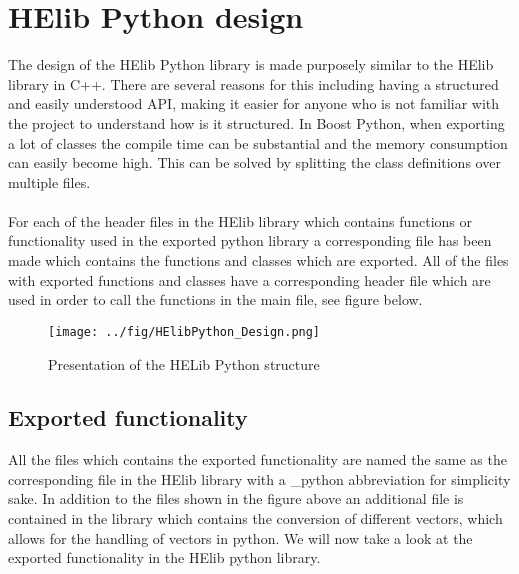 \newpage

\section{HElib Python design}
The design of the HElib Python library is made purposely similar to the HElib library in C++. There are several reasons for this including having a structured and easily understood API, making it easier for anyone who is not familiar with the project to understand how is it structured. In Boost Python, when exporting a lot of classes the compile time can be substantial and the memory consumption can easily become high. This can be solved by splitting the class definitions over multiple files\cite{boost2017}.\\\\
For each of the header files in the HElib library which contains functions or functionality used in the exported python library a corresponding file has been made which contains the functions and classes which are exported. All of the files with exported functions and classes have a corresponding header file which are used in order to call the functions in the main file, see figure below.

\begin{figure}[h]
\caption{Presentation of the HELib Python structure}
\centering
\texttt{[image: ../fig/HElibPython\_Design.png]}
\end{figure}


\subsection{Exported functionality}
All the files which contains the exported functionality are named the same as the corresponding file in the HElib library with a \_python abbreviation for simplicity sake. In addition to the files shown in the figure above an additional file is contained in the library which contains the conversion of different vectors, which allows for the handling of vectors in python. We will now take a look at the exported functionality in the HElib python library.

